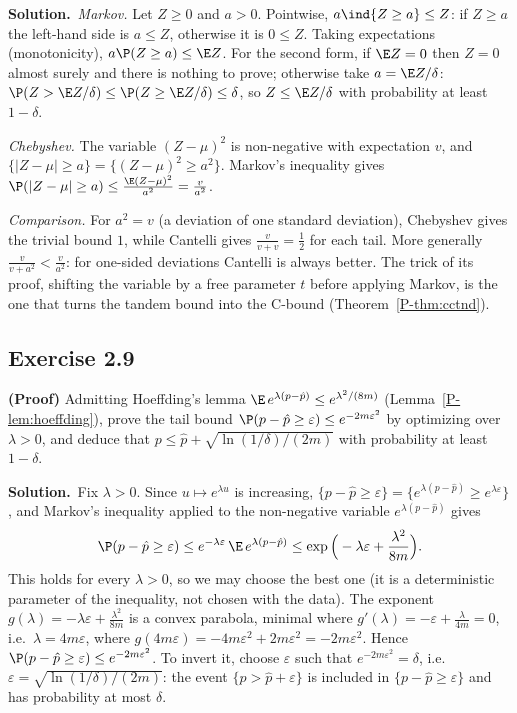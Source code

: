 \documentclass[11pt]{article}
\newcommand{\statement}[1]{\begin{tcolorbox}[enhanced,breakable,colback=black!3,colframe=black!25,boxrule=0.4pt,sharp corners,fontupper=\itshape\small]#1\end{tcolorbox}}
\newcommand{\exo}[1]{\Needspace{6\baselineskip}\subsection*{Exercise #1}\addcontentsline{toc}{subsection}{Exercise #1}}
\newcommand{\sol}{\noindent\textbf{Solution.}\ }
\begin{document}
\sol \emph{Markov.} Let $Z\geq0$ and $a>0$. Pointwise, $a\ind{Z\geq a}\leq Z$: if $Z\geq a$ the left-hand side is $a\leq Z$, otherwise
it is $0\leq Z$. Taking expectations (monotonicity), $a\P(Z\geq a)\leq\E Z$. For the second form, if $\E Z=0$ then $Z=0$ almost
surely and there is nothing to prove; otherwise take $a=\E Z/\delta$: $\P(Z>\E Z/\delta)\leq\P(Z\geq\E Z/\delta)\leq\delta$, so
$Z\leq\E Z/\delta$ with probability at least $1-\delta$.

\emph{Chebyshev.} The variable $(Z-\mu)^2$ is non-negative with expectation $v$, and $\{|Z-\mu|\geq a\}=\{(Z-\mu)^2\geq a^2\}$.
Markov's inequality gives $\P(|Z-\mu|\geq a)\leq\frac{\E(Z-\mu)^2}{a^2}=\frac v{a^2}$.

\emph{Comparison.} For $a^2=v$ (a deviation of one standard deviation), Chebyshev gives the trivial bound $1$, while
Cantelli gives $\frac{v}{v+v}=\frac12$ for each tail. More generally $\frac v{v+a^2}<\frac v{a^2}$: for one-sided deviations Cantelli
is always better. The trick of its proof, shifting the variable by a free parameter $t$ before applying Markov, is
the one that turns the tandem bound into the C-bound (Theorem~\ref{P-thm:cctnd}).

\exo{2.9}
\statement{\textbf{(Proof)} Admitting Hoeffding's lemma $\E\,e^{\lambda(p-\hat p)}\leq e^{\lambda^2/(8m)}$ (Lemma~\ref{P-lem:hoeffding}), prove the tail
bound $\P(p-\hat p\geq\varepsilon)\leq e^{-2m\varepsilon^2}$ by optimizing over $\lambda>0$, and deduce that $p\leq\hat p+\sqrt{\ln(1/\delta)/(2m)}$ with
probability at least $1-\delta$.}

\sol Fix $\lambda>0$. Since $u\mapsto e^{\lambda u}$ is increasing, $\{p-\hat p\geq\varepsilon\}=\{e^{\lambda(p-\hat p)}\geq e^{\lambda\varepsilon}\}$, and Markov's
inequality applied to the non-negative variable $e^{\lambda(p-\hat p)}$ gives
\[
\P(p-\hat p\geq\varepsilon)\leq e^{-\lambda\varepsilon}\,\E\,e^{\lambda(p-\hat p)}\leq\exp\Big(-\lambda\varepsilon+\frac{\lambda^2}{8m}\Big).
\]
This holds for every $\lambda>0$, so we may choose the best one (it is a deterministic parameter of the inequality, not
chosen with the data). The exponent $g(\lambda)=-\lambda\varepsilon+\frac{\lambda^2}{8m}$ is a convex parabola, minimal where
$g'(\lambda)=-\varepsilon+\frac{\lambda}{4m}=0$, i.e.\ $\lambda=4m\varepsilon$, where $g(4m\varepsilon)=-4m\varepsilon^2+2m\varepsilon^2=-2m\varepsilon^2$. Hence
$\P(p-\hat p\geq\varepsilon)\leq e^{-2m\varepsilon^2}$. To invert it, choose $\varepsilon$ such that $e^{-2m\varepsilon^2}=\delta$, i.e.\
$\varepsilon=\sqrt{\ln(1/\delta)/(2m)}$: the event $\{p>\hat p+\varepsilon\}$ is included in $\{p-\hat p\geq\varepsilon\}$ and has probability at most $\delta$.
\end{document}

